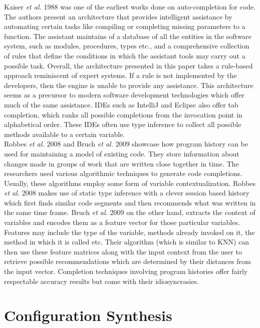 \documentclass[../thesis.tex]{subfiles}
\begin{document}
Kaiser \textit{et al.} 1988 was one of the earliest works done on auto-completion for code. The authors present an architecture that provides intelligent assistance by automating certain tasks like compiling or completing missing parameters to a function. The assistant maintains of a database of all the entities in the software system, such as modules, procedures, types etc., and a comprehensive collection of rules that define the conditions in which the assistant tools may carry out a possible task. Overall, the architecture presented in this paper takes a rule-based approach reminiscent of expert systems. If a rule is not implemented by the developers, then the engine is unable to provide any assistance. This architecture seems as a precursor to modern software development technologies which offer much of the same assistance. IDEs such as IntelliJ and Eclipse also offer tab completion, which ranks all possible completions from the invocation point in alphabetical order. These IDEs often use type inference to collect all possible methods available to a certain variable. \\

Robbes \textit{et al.} 2008 and Bruch \textit{et al.} 2009 showcase how program history can be used for maintaining a model of existing code. They store information about changes made in groups of work that are written close together in time. The researchers used various algorithmic techniques to generate code completions. Usually, these algorithms employ some form of variable contextualization. Robbes \textit{et al.} 2008 makes use of static type inference with a clever session based history which first finds similar code segments and then recommends what was written in the same time frame. Bruch \textit{et al.} 2009 on the other hand, extracts the context of variables and encodes them as a feature vector for those particular variables. Features may include the type of the variable, methods already invoked on it, the method in which it is called etc. Their algorithm (which is similar to KNN) can then use these feature matrices along with the input context from the user to retrieve possible recommendations which are determined by their distances from the input vector.  Completion techniques involving program histories offer fairly respectable accuracy results but come with their idiosyncrasies.\\  

\section{Configuration Synthesis} 
\end{document}
